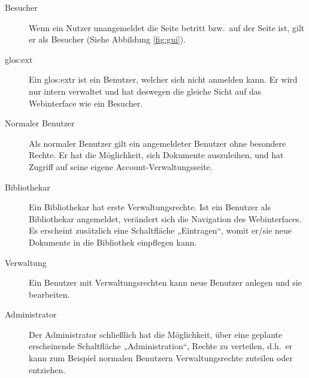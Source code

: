 \begin{description}
\item[Besucher] Wenn ein Nutzer unangemeldet die Seite betritt bzw.\ auf der Seite ist, gilt er als Besucher (Siehe Abbildung \ref{fig:gui}).
\item [\Gls{glos:ext}] Ein \gls{glos:ext}r ist ein Benutzer, welcher sich nicht anmelden kann. Er wird nur intern verwaltet und hat deswegen die gleiche Sicht
auf das Webinterface wie ein Besucher.
\item [Normaler Benutzer] Als normaler Benutzer gilt ein angemeldeter Benutzer ohne besondere Rechte. Er hat die Möglichkeit, sich Dokumente auszuleihen, und hat Zugriff auf seine eigene Account-Verwaltungsseite.
\item [Bibliothekar] Ein Bibliothekar hat erste Verwaltungsrechte. Ist ein Benutzer als Bibliothekar angemeldet, verändert sich die Navigation des Webinterfaces. Es erscheint zusätzlich eine Schaltfläche „Eintragen“, womit er/sie neue Dokumente in die Bibliothek einpflegen kann.
\item [Verwaltung] Ein Benutzer mit Verwaltungsrechten kann neue Benutzer anlegen und sie bearbeiten.
\item [Administrator] Der Administrator schließlich hat die Möglichkeit, über eine geplante erscheinende Schaltfläche „Administration“, Rechte zu verteilen, d.h.\ er kann zum Beispiel normalen Benutzern Verwaltungsrechte zuteilen oder entziehen. 
\end{description}











 
